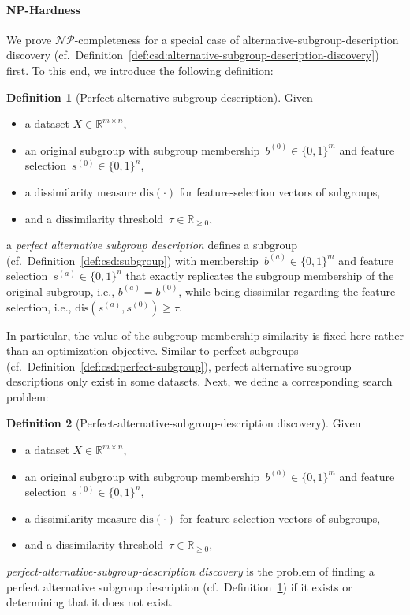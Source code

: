 \documentclass{article}
\theoremstyle{definition}
\newtheorem{definition}{Definition}
\begin{document}
\paragraph{NP-Hardness}

We prove $\mathcal{NP}$-completeness for a special case of alternative-subgroup-description discovery (cf.~Definition~\ref{def:csd:alternative-subgroup-description-discovery}) first.
To this end, we introduce the following definition:
%
\begin{definition}[Perfect alternative subgroup description]
	Given
	\begin{itemize}[noitemsep]
		\item a dataset $X \in \mathbb{R}^{m \times n}$,
		\item an original subgroup with subgroup membership~$b^{(0)} \in \{0, 1\}^m$ and feature selection~$s^{(0)} \in \{0, 1\}^n$,
		\item a dissimilarity measure $\text{dis}(\cdot)$ for feature-selection vectors of subgroups,
		\item and a dissimilarity threshold~$\tau \in \mathbb{R}_{\geq 0}$,
	\end{itemize}
	a \emph{perfect alternative subgroup description} defines a subgroup (cf.~Definition~\ref{def:csd:subgroup}) with membership~$b^{(a)} \in \{0, 1\}^m$ and feature selection~$s^{(a)} \in \{0, 1\}^n$ that exactly replicates the subgroup membership of the original subgroup, i.e., $b^{(a)} = b^{(0)}$, while being dissimilar regarding the feature selection, i.e., $\text{dis}(s^{(a)}, s^{(0)}) \geq \tau$.
	\label{def:csd:perfect-alternative}
\end{definition}
%
In particular, the value of the subgroup-membership similarity is fixed here rather than an optimization objective.
Similar to perfect subgroups (cf.~Definition~\ref{def:csd:perfect-subgroup}), perfect alternative subgroup descriptions only exist in some datasets.
Next, we define a corresponding search problem:
%
\begin{definition}[Perfect-alternative-subgroup-description discovery]
	Given
	\begin{itemize}[noitemsep]
		\item a dataset $X \in \mathbb{R}^{m \times n}$,
		\item an original subgroup with subgroup membership~$b^{(0)} \in \{0, 1\}^m$ and feature selection~$s^{(0)} \in \{0, 1\}^n$,
		\item a dissimilarity measure $\text{dis}(\cdot)$ for feature-selection vectors of subgroups,
		\item and a dissimilarity threshold~$\tau \in \mathbb{R}_{\geq 0}$,
	\end{itemize}
	\emph{perfect-alternative-subgroup-description discovery} is the problem of finding a perfect alternative subgroup description (cf.~Definition~\ref{def:csd:perfect-alternative}) if it exists or determining that it does not exist.
	\label{def:csd:perfect-alternative-subgroup-description-discovery}
\end{definition}
\end{document}
